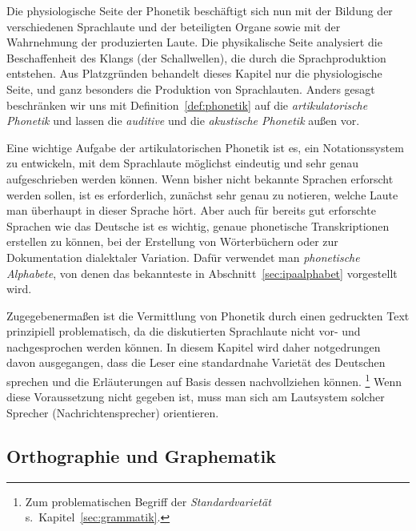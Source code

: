 Die physiologische Seite der Phonetik beschäftigt sich nun mit der Bildung der verschiedenen Sprachlaute und der beteiligten Organe sowie mit der Wahrnehmung der produzierten Laute.
Die physikalische Seite analysiert die Beschaffenheit des Klangs (der Schallwellen), die durch die Sprachproduktion entstehen.
Aus Platzgründen behandelt dieses Kapitel nur die physiologische Seite, und ganz besonders die Produktion von Sprachlauten.
Anders gesagt beschränken wir uns mit Definition~\ref{def:phonetik} auf die \textit{artikulatorische Phonetik} und lassen die \textit{auditive} und die \textit{akustische Phonetik} außen vor.


Eine wichtige Aufgabe der artikulatorischen Phonetik ist es, ein Notationssystem zu entwickeln, mit dem Sprachlaute möglichst eindeutig und sehr genau aufgeschrieben werden können.
Wenn bisher nicht bekannte Sprachen erforscht werden sollen, ist es \zB erforderlich, zunächst sehr genau zu notieren, welche Laute man überhaupt in dieser Sprache hört.
Aber auch für bereits gut erforschte Sprachen wie das Deutsche ist es wichtig, genaue phonetische Transkriptionen erstellen zu können, \zB bei der Erstellung von Wörterbüchern oder zur Dokumentation dialektaler Variation.
Dafür verwendet man \textit{phonetische Alphabete}, von denen das bekannteste in Abschnitt~\ref{sec:ipaalphabet} vorgestellt wird.

Zugegebenermaßen ist die Vermittlung von Phonetik durch einen gedruckten Text prinzipiell problematisch, da die diskutierten Sprachlaute nicht vor- und nachgesprochen werden können.
In diesem Kapitel wird daher notgedrungen davon ausgegangen, dass die Leser eine standardnahe Varietät des Deutschen sprechen und die Erläuterungen auf Basis dessen nachvollziehen können.%
\footnote{Zum problematischen Begriff der \textit{Standardvarietät} s.\ Kapitel~\ref{sec:grammatik}.}
Wenn diese Voraussetzung nicht gegeben ist, muss man sich am Lautsystem solcher Sprecher (\zB Nachrichtensprecher) orientieren.

\subsection{Orthographie und Graphematik}

